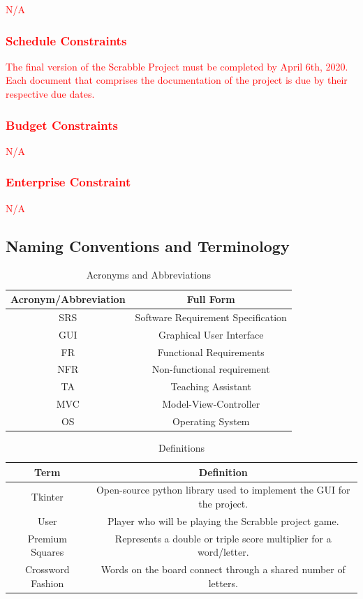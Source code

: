 \documentclass[12pt, titlepage]{article}
\begin{document}
    \textcolor{red}{N/A}
\textcolor{red}{\subsubsection{\textcolor{red}{Schedule Constraints}}}
     \textcolor{red}{The final version of the Scrabble Project must be completed by April 6th, 2020. Each document that comprises the documentation of the project is due by their respective due dates.}
\textcolor{red}{\subsubsection{\textcolor{red}{Budget Constraints}}}
    \textcolor{red}{N/A}
\textcolor{red}{\subsubsection{\textcolor{red}{Enterprise Constraint}}}
    \textcolor{red}{N/A}

\subsection{Naming Conventions and Terminology}
\begin{table}[H]
    \centering
    \caption{Acronyms and Abbreviations}
    \begin{tabular}{|c|c|}
        \midrule
        \textbf{Acronym/Abbreviation} & \textbf{Full Form} \\
        \hline
        SRS & Software Requirement Specification\\
        \hline
        GUI & Graphical User Interface \\
        \hline
        FR & Functional Requirements \\
        \hline
        NFR & Non-functional requirement\\
        \hline
        TA & Teaching Assistant\\
        \hline
        MVC & Model-View-Controller\\
        \hline
        OS & Operating System\\
        \bottomrule
    \end{tabular}
\end{table}

\begin{table}[!htb]
    \centering
    \caption{Definitions}
    \begin{tabular}{|c|c|}
        \hline
        \textbf{Term} & \textbf{Definition}\\
        \hline
        Tkinter & Open-source python library used to implement the GUI for the project. \\
        \hline
        User & Player who will be playing the Scrabble project game. \\
        \hline
        Premium Squares & Represents a double or triple score multiplier for a word/letter. \\
        \hline
        Crossword Fashion & Words on the board connect through a shared number of letters. \\
        \hline
    \end{tabular}
\end{table}
\end{document}
